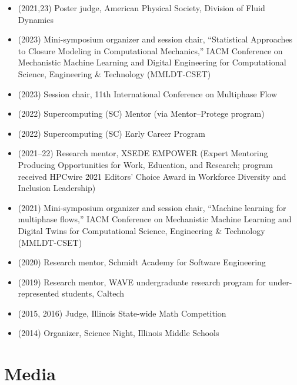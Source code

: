 \begin{itemize}
    \item (2021,23) Poster judge, American Physical Society, Division of Fluid Dynamics
    \item (2023) Mini-symposium organizer and session chair, ``Statistical Approaches to Closure Modeling in Computational Mechanics,'' IACM Conference on Mechanistic Machine Learning and Digital Engineering for Computational Science, Engineering \& Technology (MMLDT-CSET)
    \item (2023) Session chair, 11th International Conference on Multiphase Flow
    \item (2022) Supercomputing (SC) Mentor (via Mentor--Protege program)
    \item (2022) Supercomputing (SC) Early Career Program
    \item (2021--22) Research mentor, XSEDE EMPOWER (Expert Mentoring Producing Opportunities for Work, Education, and Research; program received HPCwire 2021 Editors' Choice Award in Workforce Diversity and Inclusion Leadership)
    \item (2021) Mini-symposium organizer and session chair, ``Machine learning for multiphase flows,'' IACM Conference on Mechanistic Machine Learning and Digital Twins for Computational Science, Engineering \& Technology (MMLDT-CSET)
    \item (2020) Research mentor, Schmidt Academy for Software Engineering
    \item (2019) Research mentor, WAVE undergraduate research program for under-represented students, Caltech
    \item (2015, 2016) Judge, Illinois State-wide Math Competition
    \item (2014) Organizer, Science Night, Illinois Middle Schools
\end{itemize}

\section{Media}

